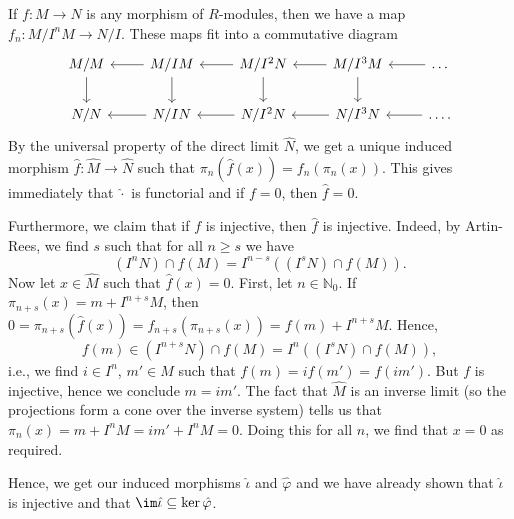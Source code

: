 If $f\colon M\to N$ is any morphism of $R$-modules, then we have a map
$f_n\colon M/I^nM \to N/I$. These maps fit into a commutative diagram
\[\begin{tikzcd}
	M/M\ar[d] & M/IM\ar[l]\ar[d] & M/I^2N\ar[d]\ar[l] & M/I^3M\ar[l]\ar[d] & \ldots\ar[l]\\
	N/N & N/IN\ar[l] & N/I^2N\ar[l] & N/I^3N\ar[l] & \ldots\ar[l].
\end{tikzcd}\]
By the universal property of the direct limit $\hat{N} $, we get a unique induced morphism
$\hat{f}\colon \hat{M}\to \hat{N}$ such that $\pi_n(\hat{f}(x)) = f_n(\pi_n(x))$.
This gives immediately that $\hat{\cdot}$ is functorial and if $f = 0$, then
$\hat{f} = 0$.

Furthermore, we claim that if $f$ is injective, then $\hat{f}$ is injective. Indeed,
by Artin-Rees, we find $s$ such that for all $n\geq s$ we have
\[ (I^nN)\cap f(M) = I^{n-s}((I^sN)\cap f(M)). \]
Now let $x \in \hat{M}$ such that $\hat{f}(x) = 0$. First, let $n \in \mathbb{N}_0$.
If $\pi_{n + s}(x) = m + I^{n + s}M$, then $0 = \pi_{n + s}(\hat{f}(x)) = f_{n + s}(\pi_{n + s}(x)) = f(m) + I^{n + s}M$.
Hence,
\[ f(m) \in (I^{n + s}N) \cap f(M) = I^n((I^sN)\cap f(M)), \]
i.e., we find $i \in I^n$, $m' \in M$ such that $f(m) = if(m') = f(im')$. But
$f$ is injective, hence we conclude $m = im'$. The fact that $\hat{M}$ is an inverse
limit (so the projections form a cone over the inverse system) tells us that
$\pi_n(x) = m + I^nM = im' + I^nM = 0$. Doing this for all $n$, we find that
$x = 0$ as required.

Hence, we get our induced morphisms $\hat{\iota}$ and $\hat{\varphi}$ and we have
already shown that $\hat{\iota}$ is injective and that $\im\hat{\iota} \subseteq \ker\hat{\varphi}$.

